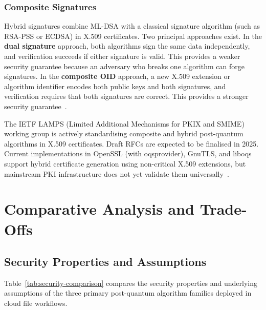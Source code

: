 \documentclass[12pt,a4paper]{article}
\begin{document}
\subsubsection{Composite Signatures}

Hybrid signatures combine ML-DSA with a classical signature algorithm (such as RSA-PSS or ECDSA) in X.509 certificates. Two principal approaches exist. In the \textbf{dual signature} approach, both algorithms sign the same data independently, and verification succeeds if either signature is valid. This provides a weaker security guarantee because an adversary who breaks one algorithm can forge signatures. In the \textbf{composite OID} approach, a new X.509 extension or algorithm identifier encodes both public keys and both signatures, and verification requires that both signatures are correct. This provides a stronger security guarantee~\cite{ietf-lamps-composite-sigs-2024,ietf-lamps-composite-kem-2024}.

The IETF LAMPS (Limited Additional Mechanisms for PKIX and SMIME) working group is actively standardising composite and hybrid post-quantum algorithms in X.509 certificates. Draft RFCs are expected to be finalised in 2025. Current implementations in OpenSSL (with oqsprovider), GnuTLS, and liboqs support hybrid certificate generation using non-critical X.509 extensions, but mainstream PKI infrastructure does not yet validate them universally~\cite{ietf-lamps-composite-sigs-2024,ietf-lamps-composite-kem-2024}.


\section{Comparative Analysis and Trade-Offs}

\subsection{Security Properties and Assumptions}

Table~\ref{tab:security-comparison} compares the security properties and underlying assumptions of the three primary post-quantum algorithm families deployed in cloud file workflows.
\end{document}
